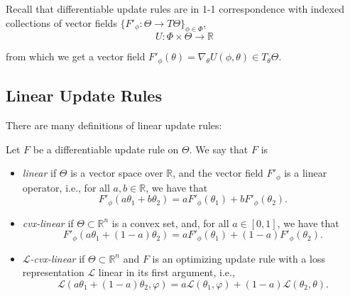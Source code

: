 \documentclass{article}
\begin{document}
Recall that differentiable update rules are in 1-1 correspondence with indexed
collections of vector fields $\{ F'_\phi : \Theta \to T\Theta \}_{\phi \in \Phi}$,
\[
    U : \Phi \times \Theta\to \mathbb R
\]

from which we get a vector field $F'_\phi(\theta) = \nabla_{\theta} U(\phi, \theta) \in T_{\theta} \Theta$.


\subsection{Linear Update Rules}


There are many definitions of linear update rules:
\begin{defn}\label{ax:linear}
Let $F$ be a differentiable update rule on $\Theta$. We say that $F$ is \textellipsis
\begin{itemize}
    \item \emph{linear} if $\Theta$ is a vector space over $\mathbb R$, and the
    vector field $F'_\phi$ is a linear operator, i.e., for all $a, b \in \mathbb R$, we have that
    \[ F'_\phi(a \theta_1 + b \theta_2) = a F'_\phi(\theta_1) + b F'_\phi(\theta_2). \]

    \item \emph{cvx-linear} if $\Theta \subset \mathbb R^n$ is a convex set, and, for all $a \in [0,1]$, we have that
    \[ F'_\phi(a \theta_1 + (1-a) \theta_2) = a F'_\phi(\theta_1) + (1-a) F'_\phi(\theta_2). \]

    \item \emph{$\mathcal L$-cvx-linear} if $\Theta \subset \mathbb R^n$ and $F$ is an optimizing update rule with a loss representation $\mathcal L$ linear in its first argument, i.e.,
    \[
        \mathcal L(a \theta_1 + (1-a) \theta_2, \varphi) = a \mathcal L(\theta_1, \varphi) + (1-a) \mathcal L(\theta_2, \theta).
    \]
\end{itemize}
\end{defn}
\end{document}
